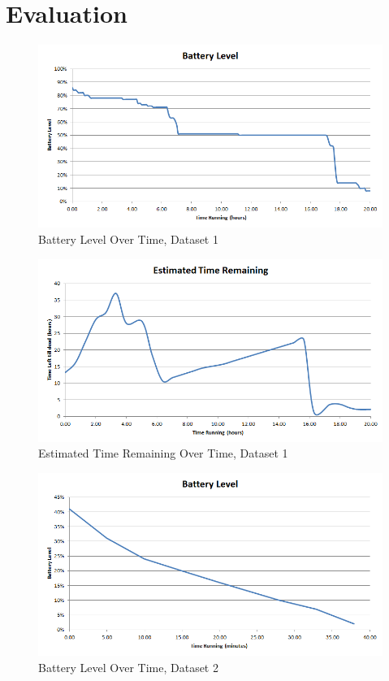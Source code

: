 \section{Evaluation}
\label{sec:evaluation}
\begin{figure}[ht!]
	\begin{center}
		\includegraphics[scale=0.5]{figs/BatteryLevelLong.png}
		\caption{Battery Level Over Time, Dataset 1}
		\label{fig:bat_level}
\end{center}
\end{figure}
\begin{figure}[ht!]
	\begin{center}
		\includegraphics[scale=0.5]{figs/EstimatedTimeRemainingLong.png}
		\caption{Estimated Time Remaining Over Time, Dataset 1}
		\label{fig:est_remaining}
\end{center}
\end{figure}
\begin{figure}[ht!]
	\begin{center}
		\includegraphics[scale=0.5]{figs/BatteryLevelShort.png}
		\caption{Battery Level Over Time, Dataset 2}
		\label{fig:bat_vs_time_short}
\end{center}
\end{figure}
